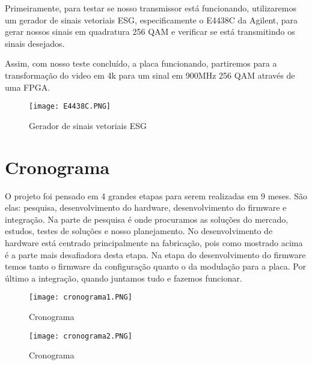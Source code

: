 Primeiramente, para testar se nosso transmissor está funcionando, utilizaremos um gerador de sinais vetoriais ESG, especificamente o E4438C da Agilent\cite{E4438C}, para gerar nossos sinais em quadratura 256 QAM e verificar se está transmitindo os sinais desejados.

Assim, com nosso teste concluído, a placa funcionando, partiremos para a transformação do video em 4k para um sinal em 900MHz 256 QAM através de uma FPGA.

\begin{figure}[htbp]
            \centering
            \caption{Gerador de sinais vetoriais ESG}
            \texttt{[image: E4438C.PNG]}
            
            \centering
            \label{E4438C}
        \end{figure}

\section{Cronograma}

O projeto foi pensado em 4 grandes etapas para serem realizadas em 9 meses. São elas: pesquisa, desenvolvimento do hardware, desenvolvimento do firmware e integração. Na parte de pesquisa é onde procuramos as soluções do mercado, estudos, testes de soluções e nosso planejamento. No desenvolvimento de hardware está centrado principalmente na fabricação, pois como mostrado acima é a parte mais desafiadora desta etapa. Na etapa do desenvolvimento do firmware temos tanto o firmware da configuração quanto o da modulação para a placa. Por último a integração, quando juntamos tudo e fazemos funcionar.

\begin{figure}[htbp]
            \centering
            \caption{Cronograma}
            \texttt{[image: cronograma1.PNG]}
            
            \centering
            \label{Cronograma}
        \end{figure}

\begin{figure}[htbp]
            \centering
            \caption{Cronograma}
            \texttt{[image: cronograma2.PNG]}
            
            \centering
            \label{cronograma2}
        \end{figure}